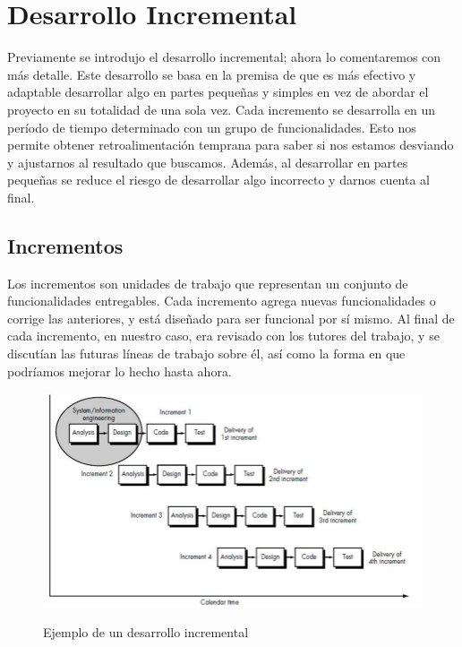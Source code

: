\section{Desarrollo Incremental}

Previamente se introdujo el desarrollo incremental; ahora lo comentaremos con más detalle.
Este desarrollo se basa en la premisa de que es más efectivo y adaptable desarrollar algo en partes pequeñas y simples en vez de abordar el proyecto en su totalidad de una sola vez. Cada incremento se desarrolla en un período de tiempo determinado con un grupo de funcionalidades. Esto nos permite obtener retroalimentación temprana para saber si nos estamos desviando y ajustarnos al resultado que buscamos. Además, al desarrollar en partes pequeñas se reduce el riesgo de desarrollar algo incorrecto y darnos cuenta al final.

\subsection{Incrementos}

Los incrementos son unidades de trabajo que representan un conjunto de funcionalidades entregables. Cada incremento agrega nuevas funcionalidades o corrige las anteriores, y está diseñado para ser funcional por sí mismo. Al final de cada incremento, en nuestro caso, era revisado con los tutores del trabajo, y se discutían las futuras líneas de trabajo sobre él, así como la forma en que podríamos mejorar lo hecho hasta ahora.


\begin{figure}[h]
\centering
\includegraphics[width=12cm]{imaxes/Incremental-software-development-model.png}
\label{fig:pointnetc}
\caption{Ejemplo de un desarrollo incremental \cite{inproceedings}}
\end{figure}


